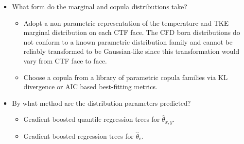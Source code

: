 \documentclass[t, pdftex]{beamer}
\begin{document}
\begin{frame}
{\begin{itemize}
        \item What form do the marginal and copula distributions take?
        \begin{itemize}
            \item Adopt a non-parametric representation of the temperature and TKE marginal distribution on each CTF face.  The CFD born distributions do not conform to a known parametric distribution family and cannot be reliably transformed to be Gaussian-like since this transformation would vary from CTF face to face.
            \item Choose a copula from a library of parametric copula families via KL divergence or AIC based best-fitting metrics.
        \end{itemize}        
        \item By what method are the distribution parameters predicted?
        \begin{itemize}
            \item Gradient boosted quantile regression trees for $\hat \theta_{x,y}$.
            \item Gradient boosted regression trees for $\hat \theta_{c}$.
        \end{itemize}
    \end{itemize}
}
\end{frame}

\end{document}
